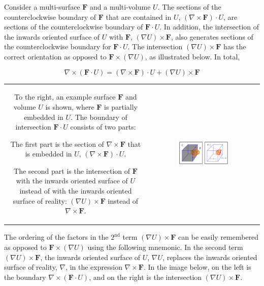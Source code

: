 Consider a multi-surface \(\mathbf{F}\) and a multi-volume \(U\). The sections of the counterclockwise boundary of \(\mathbf{F}\) that are contained in \(U\), \((\nabla \times \mathbf{F}) \cdot U\), are sections of the counterclockwise boundary of \(\mathbf{F} \cdot U\). In addition, the intersection of the inwards oriented surface of \(U\) with \(\mathbf{F}\), \((\nabla U) \times \mathbf{F}\), also generates sections of the counterclockwise boundary for \(\mathbf{F} \cdot U\). The intersection \((\nabla U) \times \mathbf{F}\) has the correct orientation as opposed to \(\mathbf{F} \times (\nabla U)\), as illustrated below. In total,  

\begin{thm}
\[\nabla \times (\mathbf{F} \cdot U) = (\nabla \times \mathbf{F}) \cdot U + (\nabla U) \times \mathbf{F}\]
\end{thm}

\begin{tabular}{cc}
\parbox{0.5\textwidth}{
To the right, an example surface \(\mathbf{F}\) and volume \(U\) is shown, where \(\mathbf{F}\) is partially embedded in \(U\). The boundary of intersection \(\mathbf{F} \cdot U\) consists of two parts: 

The first part is the section of \(\nabla \times \mathbf{F}\) that is embedded in \(U\), \((\nabla \times \mathbf{F}) \cdot U\). 

The second part is the intersection of \(\mathbf{F}\) with the inwards oriented surface of \(U\) instead of with the inwards oriented surface of reality: \((\nabla U) \times \mathbf{F}\) instead of \(\nabla \times \mathbf{F}\).  
} & \parbox{0.5\textwidth}{
\includegraphics[width = 0.5\textwidth]{Boundaries/Surface_boundaries/surface_volume_intersection_boundary}
}
\end{tabular}

The ordering of the factors in the \(2^\text{nd}\) term \((\nabla U) \times \mathbf{F}\) can be easily remembered as opposed to \(\mathbf{F} \times (\nabla U)\) using the following mnemonic. In the second term \((\nabla U) \times \mathbf{F}\), the inwards oriented surface of \(U\), \(\nabla U\), replaces the inwards oriented surface of reality, \(\nabla\), in the expression \(\nabla \times \mathbf{F}\). In the image below, on the left is the boundary \(\nabla \times (\mathbf{F} \cdot U)\), and on the right is the intersection \((\nabla U) \times \mathbf{F}\).

